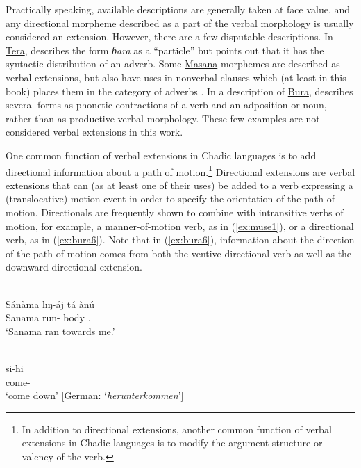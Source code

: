 Practically speaking, available descriptions are generally taken at face value, and any directional morpheme described as a part of the verbal morphology is usually considered an extension. However, there are a few disputable descriptions. In \hyperref[tera]{Tera}, \citet[18]{newmanGrammarTeraTransformational1970} describes the form \textit{ɓara} as a ``particle'' but \citet[314--315]{schuhChadicCornucopia2017} points out that it has the syntactic distribution of an adverb. Some \hyperref[masa]{Masana} morphemes are described as verbal extensions, but also have uses in nonverbal clauses which (at least in this book) places them in the category of adverbs \citep[226]{melisDescriptionMasaTchad1999}. In a description of \hyperref[bura]{Bura}, \citet[284--289]{hoffmannUntersuchungenZurStruktur1955} describes several forms as phonetic contractions of a verb and an adposition or noun, rather than as productive verbal morphology. These few examples are not considered verbal extensions in this work.

One common function of verbal extensions in Chadic languages is to add directional information about a path of motion.\footnote{In addition to directional extensions, another common function of verbal extensions in Chadic languages is to modify the argument structure or valency of the verb.} Directional extensions are verbal extensions that can (as at least one of their uses) be added to a verb expressing a (translocative) motion event in order to specify the orientation of the path of motion. Directionals are frequently shown to combine with intransitive verbs of motion, for example, a manner-of-motion verb, as in (\ref{ex:muse1}), or a directional verb, as in (\ref{ex:bura6}). Note that in (\ref{ex:bura6}), information about the direction of the path of motion comes from both the ventive directional verb as well as the downward directional extension.  

\ea\label{ex:muse1}
 \\
\gll Sánàmā līŋ-áj tá ànú	\\
Sanama run- body . \\
\glt `Sanama ran towards me.'

\ex\label{ex:bura6}
 \\
\gll si-hi \\
come- \\
\glt `come down' [German: `\textit{herunterkommen}']
\z 

